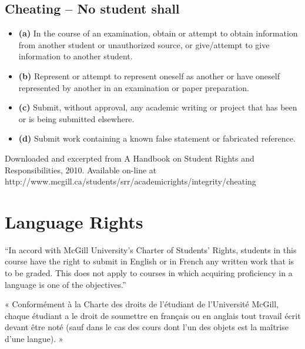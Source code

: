 \documentclass[
  letterpaper,
  DIV=11,
  numbers=noendperiod]{scrartcl}
\providecommand{\tightlist}{%
  \setlength{\itemsep}{0pt}\setlength{\parskip}{0pt}}\usepackage{longtable,booktabs,array}
\begin{document}
\subsection{Cheating -- No student
shall}\label{cheating-no-student-shall}

\begin{itemize}
\tightlist
\item
  \textbf{(a)} In the course of an examination, obtain or attempt to
  obtain information from another student or unauthorized source, or
  give/attempt to give information to another student.
\item
  \textbf{(b)} Represent or attempt to represent oneself as another or
  have oneself represented by another in an examination or paper
  preparation.
\item
  \textbf{(c)} Submit, without approval, any academic writing or project
  that has been or is being submitted elsewhere.
\item
  \textbf{(d)} Submit work containing a known false statement or
  fabricated reference.
\end{itemize}

Downloaded and excerpted from A Handbook on Student Rights and
Responsibilities, 2010. Available on-line at
http://www.mcgill.ca/students/srr/academicrights/integrity/cheating

\section{Language Rights}\label{language-rights}

``In accord with McGill University's Charter of Students' Rights,
students in this course have the right to submit in English or in French
any written work that is to be graded. This does not apply to courses in
which acquiring proficiency in a language is one of the objectives.''

« Conformément à la Charte des droits de l'étudiant de l'Université
McGill, chaque étudiant a le droit de soumettre en français ou en
anglais tout travail écrit devant être noté (sauf dans le cas des cours
dont l'un des objets est la maîtrise d'une langue). »
\end{document}

